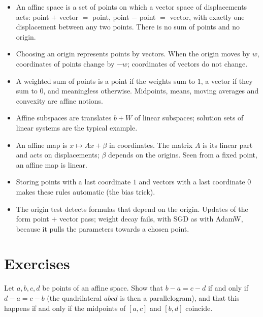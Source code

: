 \begin{notechapter}
\begin{chaptersummary}
\begin{itemize}[nosep]
  \item An affine space is a set of points on which a vector space of
        displacements acts: point $+$ vector $=$ point, point $-$ point $=$
        vector, with exactly one displacement between any two points.
        There is no sum of points and no origin.
  \item Choosing an origin represents points by vectors. When the origin
        moves by $w$, coordinates of points change by $-w$; coordinates of
        vectors do not change.
  \item A weighted sum of points is a point if the weights sum to $1$, a
        vector if they sum to $0$, and meaningless otherwise. Midpoints,
        means, moving averages and convexity are affine notions.
  \item Affine subspaces are translates $b + W$ of linear subspaces;
        solution sets of linear systems are the typical example.
  \item An affine map is $x\mapsto Ax + \beta$ in coordinates. The matrix
        $A$ is its linear part and acts on displacements; $\beta$ depends
        on the origins. Seen from a fixed point, an affine map is linear.
  \item Storing points with a last coordinate $1$ and vectors with a last
        coordinate $0$ makes these rules automatic (the bias trick).
  \item The origin test detects formulas that depend on the origin.
        Updates of the form point $+$ vector pass; weight decay fails,
        with SGD as with AdamW, because it pulls the parameters towards a
        chosen point.
\end{itemize}
\end{chaptersummary}

\section*{Exercises}

\begin{exercise}\label{affine-spaces:exr:1}
Let $a, b, c, d$ be points of an affine space. Show that $b - a = c - d$
if and only if $d - a = c - b$ (the quadrilateral $abcd$ is then a
parallelogram), and that this happens if and only if the midpoints of
$[a, c]$ and $[b, d]$ coincide.
\end{exercise}


\end{notechapter}
